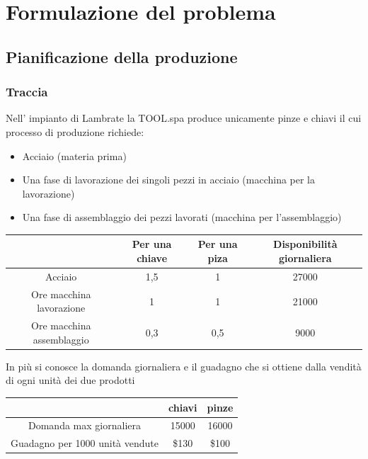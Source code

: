 \chapter{Formulazione del problema}
\section{Pianificazione della produzione}
\subsection{Traccia}
Nell' impianto di Lambrate la TOOL.spa produce unicamente pinze e
chiavi il cui processo di produzione richiede:
\begin{itemize}
    \item Acciaio (materia prima)
    \item Una fase di lavorazione dei singoli pezzi in acciaio (macchina per la lavorazione)
    \item Una fase di assemblaggio dei pezzi lavorati (macchina per l'assemblaggio)
\end{itemize}

\vspace{0.5cm}

\begin{center}
    \begin{tabular}{|c|c|c|c|}
        \hline
        & Per una chiave & Per una piza & Disponibilità giornaliera \\ \hline
        Acciaio & 1,5 & 1 & 27000 \\ \hline
        Ore macchina lavorazione & 1 & 1 & 21000 \\ \hline
        Ore macchina assemblaggio & 0,3 & 0,5 & 9000 \\ \hline
    \end{tabular}
\end{center}

\vspace{0.5cm}

In più si conosce la domanda giornaliera e il guadagno che si ottiene dalla vendità di ogni unità dei due prodotti

\vspace{0.5cm}

\begin{center}
    \begin{tabular}{|c|c|c|}
        \hline & chiavi & pinze \\ \hline
        Domanda max giornaliera & 15000 & 16000 \\ \hline
        Guadagno per 1000 unità vendute & \$130 & \$100  \\ \hline
    \end{tabular}
\end{center}

